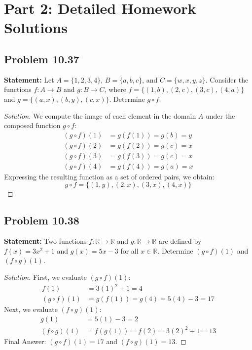 \documentclass[11pt, a4paper]{article}
\theoremstyle{definition}
\theoremstyle{remark}
\newcommand{\R}{\mathbb{R}}
\begin{document}
\section{Part 2: Detailed Homework Solutions}

\subsection*{Problem 10.37}
\textbf{Statement:} Let $A = \{1, 2, 3, 4\}$, $B = \{a, b, c\}$, and $C = \{w, x, y, z\}$. Consider the functions $f: A \to B$ and $g: B \to C$, where $f = \{(1, b), (2, c), (3, c), (4, a)\}$ and $g = \{(a, x), (b, y), (c, x)\}$. Determine $g \circ f$.

\begin{proof}[Solution]
We compute the image of each element in the domain $A$ under the composed function $g \circ f$:
\begin{align*}
    (g \circ f)(1) &= g(f(1)) = g(b) = y \\
    (g \circ f)(2) &= g(f(2)) = g(c) = x \\
    (g \circ f)(3) &= g(f(3)) = g(c) = x \\
    (g \circ f)(4) &= g(f(4)) = g(a) = x
\end{align*}
Expressing the resulting function as a set of ordered pairs, we obtain:
\[ g \circ f = \{(1, y), (2, x), (3, x), (4, x)\} \]
\end{proof}

\subsection*{Problem 10.38}
\textbf{Statement:} Two functions $f: \R \to \R$ and $g: \R \to \R$ are defined by $f(x) = 3x^2 + 1$ and $g(x) = 5x - 3$ for all $x \in \R$. Determine $(g \circ f)(1)$ and $(f \circ g)(1)$.

\begin{proof}[Solution]
First, we evaluate $(g \circ f)(1)$:
\begin{align*}
    f(1) &= 3(1)^2 + 1 = 4 \\
    (g \circ f)(1) &= g(f(1)) = g(4) = 5(4) - 3 = 17
\end{align*}
Next, we evaluate $(f \circ g)(1)$:
\begin{align*}
    g(1) &= 5(1) - 3 = 2 \\
    (f \circ g)(1) &= f(g(1)) = f(2) = 3(2)^2 + 1 = 13
\end{align*}
Final Answer: $(g \circ f)(1) = 17$ and $(f \circ g)(1) = 13$.
\end{proof}
\end{document}
